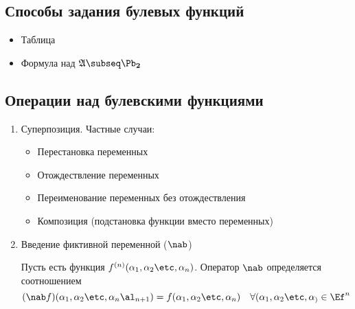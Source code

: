 \documentclass[unicode, 10pt, a4paper, oneside, fleqn]{article}
\begin{document}
\subsection{Способы задания булевых функций}
\begin{itemize}
 \item Таблица
 \item Формула над $\ag\subseq\PD$
\end{itemize}
\subsection{Операции над булевскими функциями}
\begin{enumerate}
  \item Суперпозиция. Частные случаи:
    \begin{itemize}
      \item Перестановка переменных
      \item Отождествление переменных
      \item Переименование переменных без отождествления
      \item Композиция (подстановка функции вместо переменных)
    \end{itemize}
  \item Введение фиктивной переменной ($\nab$)
    \begin{df} 
      Пусть есть функция $f^{(n)}(\set{n})$. Оператор $\nab$ определяется соотношением
      \begin{displaymath}
        (\nab f)(\set{n}\al_{n+1})=f(\set{n})  \quad \forall (\set) \in \Ef^n
      \end{displaymath}
    \end{df}
\end{enumerate}
\end{document}

